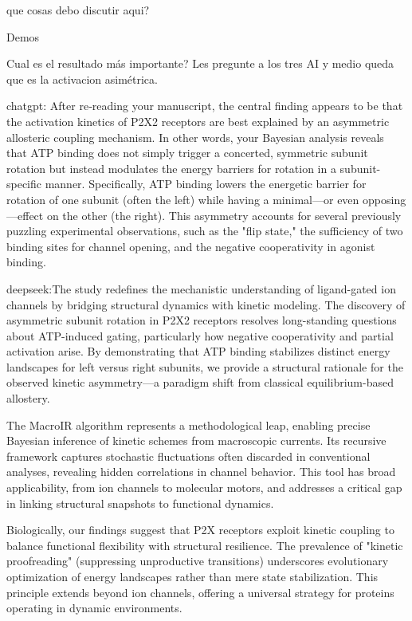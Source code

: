 \documentclass[a4paper,12pt]{article}
\begin{document}
		que cosas debo discutir aqui?
		
		Demos
		
		Cual es el resultado más importante?
		Les pregunte a los tres AI y medio queda que es la activacion asimétrica. 
		
		chatgpt: After re‐reading your manuscript, the central finding appears to be that the activation kinetics of P2X2 receptors are best explained by an asymmetric allosteric coupling mechanism. In other words, your Bayesian analysis reveals that ATP binding does not simply trigger a concerted, symmetric subunit rotation but instead modulates the energy barriers for rotation in a subunit-specific manner. Specifically, ATP binding lowers the energetic barrier for rotation of one subunit (often the left) while having a minimal—or even opposing—effect on the other (the right). This asymmetry accounts for several previously puzzling experimental observations, such as the "flip state," the sufficiency of two binding sites for channel opening, and the negative cooperativity in agonist binding.
		
		deepseek:The study redefines the mechanistic understanding of ligand-gated ion channels by bridging structural dynamics with kinetic modeling. The discovery of asymmetric subunit rotation in P2X2 receptors resolves long-standing questions about ATP-induced gating, particularly how negative cooperativity and partial activation arise. By demonstrating that ATP binding stabilizes distinct energy landscapes for left versus right subunits, we provide a structural rationale for the observed kinetic asymmetry—a paradigm shift from classical equilibrium-based allostery.
		
		The MacroIR algorithm represents a methodological leap, enabling precise Bayesian inference of kinetic schemes from macroscopic currents. Its recursive framework captures stochastic fluctuations often discarded in conventional analyses, revealing hidden correlations in channel behavior. This tool has broad applicability, from ion channels to molecular motors, and addresses a critical gap in linking structural snapshots to functional dynamics.
		
		Biologically, our findings suggest that P2X receptors exploit kinetic coupling to balance functional flexibility with structural resilience. The prevalence of "kinetic proofreading" (suppressing unproductive transitions) underscores evolutionary optimization of energy landscapes rather than mere state stabilization. This principle extends beyond ion channels, offering a universal strategy for proteins operating in dynamic environments.
		
\end{document}
